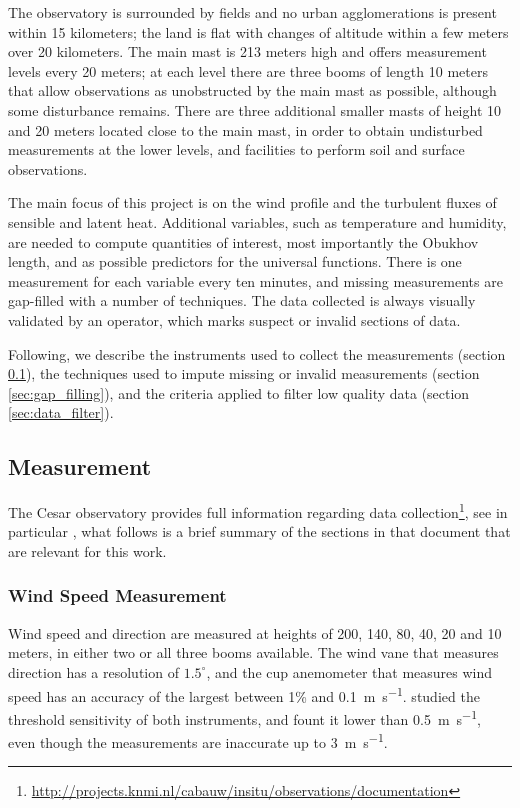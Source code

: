 \documentclass[a4paper]{book}
\begin{document}
The observatory is surrounded by fields and no urban agglomerations is present within 15 kilometers; the land is flat with changes of altitude within a few meters over 20 kilometers. The main mast is 213 meters high and offers measurement levels every 20 meters; at each level there are three booms of length 10 meters that allow observations as unobstructed by the main mast as possible, although some disturbance remains. There are three additional smaller masts of height 10 and 20 meters located close to the main mast, in order to obtain undisturbed measurements at the lower levels, and facilities to perform soil and surface observations.

The main focus of this project is on the wind profile and the turbulent fluxes of sensible and latent heat. Additional variables, such as temperature and humidity, are needed to compute quantities of interest, most importantly the Obukhov length, and as possible predictors for the universal functions. There is one measurement for each variable every ten minutes, and missing measurements are gap-filled with a number of techniques. The data collected is always visually validated by an operator, which marks suspect or invalid sections of data.

Following, we describe the instruments used to collect the measurements (section \ref{sec:measurement}), the techniques used to impute missing or invalid measurements (section \ref{sec:gap_filling}), and the criteria applied to filter low quality data (section \ref{sec:data_filter}).

\subsection{Measurement}
\label{sec:measurement}
The Cesar observatory provides full information regarding data collection\footnote{\url{http://projects.knmi.nl/cabauw/insitu/observations/documentation}}, see in particular \cite{cabauwinsitu}, what follows is a brief summary of the sections in that document that are relevant for this work.

\subsubsection{Wind Speed Measurement}
Wind speed and direction are measured at heights of 200, 140, 80, 40, 20 and 10 meters, in either two or all three booms available. The wind vane that measures direction has a resolution of $1.5^\circ$, and the cup anemometer that measures wind speed has an accuracy of the largest between 1\% and \SI{0.1}{\meter\per\second}. \cite{windinstr} studied the threshold sensitivity of both instruments, and fount it lower than \SI{0.5}{\meter\per\second}, even though the measurements are inaccurate up to \SI{3}{\meter\per\second}.
\end{document}
